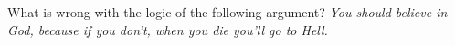 What is wrong with the logic of the following argument? \emph{You should believe in God, because if
you don't, when you die you'll go to Hell.}
